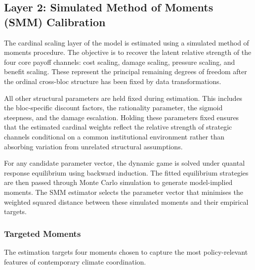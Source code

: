 \documentclass[12pt,a4paper]{article}
\begin{document}
\subsection{Layer 2: Simulated Method of Moments (SMM) Calibration}

The cardinal scaling layer of the model is estimated using a simulated method of moments procedure. The objective is to recover the latent relative strength of the four core payoff channels: cost scaling, damage scaling, pressure scaling, and benefit scaling. These represent the principal remaining degrees of freedom after the ordinal cross-bloc structure has been fixed by data transformations.

All other structural parameters are held fixed during estimation. This includes the bloc-specific discount factors, the rationality parameter, the sigmoid steepness, and the damage escalation. Holding these parameters fixed ensures that the estimated cardinal weights reflect the relative strength of strategic channels conditional on a common institutional environment rather than absorbing variation from unrelated structural assumptions.

For any candidate parameter vector, the dynamic game is solved under quantal response equilibrium using backward induction. The fitted equilibrium strategies are then passed through Monte Carlo simulation to generate model-implied moments. The SMM estimator selects the parameter vector that minimises the weighted squared distance between these simulated moments and their empirical targets.

\subsubsection{Targeted Moments}

The estimation targets four moments chosen to capture the most policy-relevant features of contemporary climate coordination.
\end{document}
